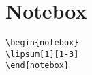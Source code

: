 
\section{Notebox}

\begin{verbatim}
\begin{notebox}
\lipsum[1][1-3]
\end{notebox}
\end{verbatim}
\begin{notebox}
\lipsum[1][1-3]
\end{notebox}



